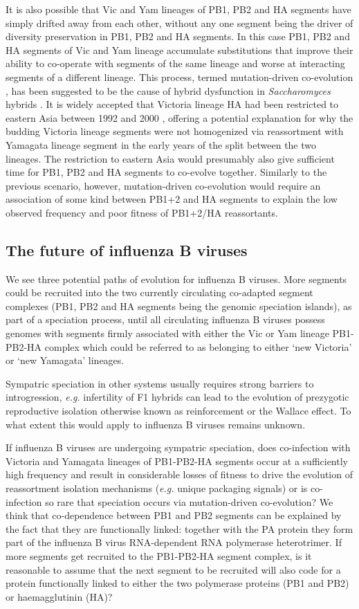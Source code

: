 \documentclass[11pt,oneside,letterpaper]{article}
\begin{document}
It is also possible that Vic and Yam lineages of PB1, PB2 and HA segments have simply drifted away from each other, without any one segment being the driver of diversity preservation in PB1, PB2 and HA segments.
In this case PB1, PB2 and HA segments of Vic and Yam lineage accumulate substitutions that improve their ability to co-operate with segments of the same lineage and worse at interacting segments of a different lineage.
This process, termed mutation-driven co-evolution \cite{presgraves2010}, has been suggested to be the cause of hybrid dysfunction in \textit{Saccharomyces} hybrids \cite{lee2008}.
It is widely accepted that Victoria lineage HA had been restricted to eastern Asia between 1992 and 2000 \cite{nerome1998,shaw2002}, offering a potential explanation for why the budding Victoria lineage segments were not homogenized via reassortment with Yamagata lineage segment in the early years of the split between the two lineages. 
The restriction to eastern Asia would presumably also give sufficient time for PB1, PB2 and HA segments to co-evolve together.
Similarly to the previous scenario, however, mutation-driven co-evolution would require an association of some kind between PB1+2 and HA segments to explain the low observed frequency and poor fitness of PB1+2/HA reassortants.

\subsection*{The future of influenza B viruses}
We see three potential paths of evolution for influenza B viruses.
More segments could be recruited into the two currently circulating co-adapted segment complexes (PB1, PB2 and HA segments being the genomic speciation islands), as part of a speciation process, until all circulating influenza B viruses possess genomes with segments firmly associated with either the Vic or Yam lineage PB1-PB2-HA complex which could be referred to as belonging to either `new Victoria' or `new Yamagata' lineages.

Sympatric speciation in other systems usually requires strong barriers to introgression, \textit{e.g.} infertility of F1 hybrids can lead to the evolution of prezygotic reproductive isolation otherwise known as reinforcement or the Wallace effect.
To what extent this would apply to influenza B viruses remains unknown.

If influenza B viruses are undergoing sympatric speciation, does co-infection with Victoria and Yamagata lineages of PB1-PB2-HA segments occur at a sufficiently high frequency and result in considerable losses of fitness to drive the evolution of reassortment isolation mechanisms (\textit{e.g.} unique packaging signals) or is co-infection so rare that speciation occurs via mutation-driven co-evolution?
We think that co-dependence between PB1 and PB2 segments can be explained by the fact that they are functionally linked: together with the PA protein they form part of the influenza B virus RNA-dependent RNA polymerase heterotrimer.
If more segments get recruited to the PB1-PB2-HA segment complex, is it reasonable to assume that the next segment to be recruited will also code for a protein functionally linked to either the two polymerase proteins (PB1 and PB2) or haemagglutinin (HA)?
\end{document}
